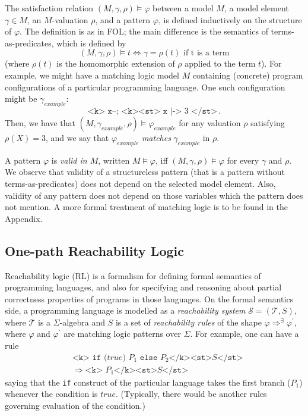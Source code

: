 The satisfaction relation $(M, \gamma, \rho) \vDash \varphi$ between a model $M$, a model element $\gamma \in M$,
an $M$-valuation $\rho$, and a pattern $\varphi$, is defined inductively on the structure of $\varphi$.
The definition is as in FOL; the main difference is the semantics of terms-as-predicates, which is defined by
\begin{equation*}
    (M, \gamma, \rho) \vDash t \iff \gamma = \rho(t) \text{ if t is a term}
\end{equation*}
(where $\rho(t)$ is the homomorphic extension of $\rho$ applied to the term $t$).
For example, we might have a matching logic model $M$ containing (concrete) program configurations
of a particular programming language.
One such configuration might be $\gamma_{\mathit{example}}$:
\begin{equation*}
    \texttt{<k> x--; <k><st> x} \texttt{ |-> } 3\texttt{ </st>} \, .
\end{equation*}
Then, we have that $(M, \gamma_{\mathit{example}}, \rho) \vDash \varphi_{\mathit{example}}$
for any valuation $\rho$ satisfying $\rho(X) = 3$, and we say that
$\varphi_{\mathit{example}}$ \emph{matches} $\gamma_{\mathit{example}}$ in $\rho$.


A pattern $\varphi$ is \emph{valid in $M$}, written $M \vDash \varphi$, iff $(M, \gamma, \rho) \vDash \varphi$
for every $\gamma$ and $\rho$.
We observe that validity of a structureless pattern (that is a pattern without terms-as-predicates) does not depend on the selected model element.
Also, validity of any pattern does not depend on those variables which the pattern does not mention.
A more formal treatment of matching logic is to be found in the Appendix.


\subsection{One-path Reachability Logic}
Reachability logic \cite{RosuS12oopsla, StefanescuCMMSR19} (RL) is a formalism for
defining formal semantics of programming languages,
and also for specifying and reasoning about partial correctness properties
of programs in those languages.
On the formal semantics side, a programming language is modelled as a \emph{reachability system}
$\mathcal{S} = (\mathcal{T}, S)$, where $\mathcal{T}$ is a $\Sigma$-algebra
and $S$ is a set of \emph{reachability rules} of the shape $\varphi \Rightarrow^\exists \varphi^\prime$,
where $\varphi$ and $\varphi^\prime$ are matching logic patterns over $\Sigma$.
For example, one can have a rule
\begin{equation}\label{eqn:ruleIfTrue}
    \begin{aligned}
    & \texttt{<k> if (} \mathit{true} \texttt{) }P_1\texttt{ else } P_2 \texttt{</k><st>} S \texttt{</st>} \\
    & \Rightarrow \texttt{<k> }P_1 \texttt{</k><st>} S \texttt{</st>}
    \end{aligned}
\end{equation}
saying that the \texttt{if} construct of the particular language takes the first branch ($P_1$)
whenever the condition is $\mathit{true}$.
(Typically, there would be another rules governing evaluation of the condition.)

